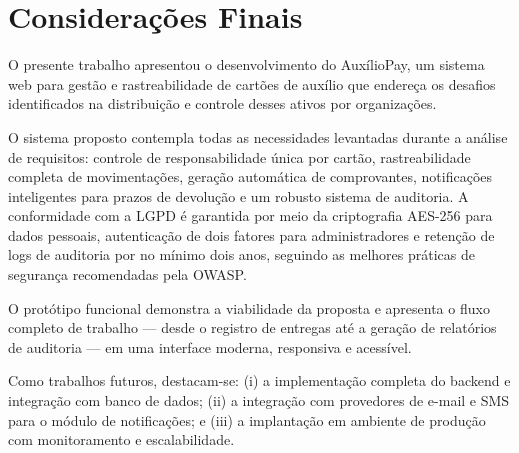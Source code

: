 \documentclass[
  article,
  a4paper,
  12pt,
  oneside,
  fleqn
]{abntex2}
\begin{document}
\section{Considerações Finais}

O presente trabalho apresentou o desenvolvimento do AuxílioPay, um sistema web para gestão e rastreabilidade de cartões de auxílio que endereça os desafios identificados na distribuição e controle desses ativos por organizações.

O sistema proposto contempla todas as necessidades levantadas durante a análise de requisitos: controle de responsabilidade única por cartão, rastreabilidade completa de movimentações, geração automática de comprovantes, notificações inteligentes para prazos de devolução e um robusto sistema de auditoria. A conformidade com a LGPD é garantida por meio da criptografia AES-256 para dados pessoais, autenticação de dois fatores para administradores e retenção de logs de auditoria por no mínimo dois anos, seguindo as melhores práticas de segurança recomendadas pela OWASP.

O protótipo funcional demonstra a viabilidade da proposta e apresenta o fluxo completo de trabalho --- desde o registro de entregas até a geração de relatórios de auditoria --- em uma interface moderna, responsiva e acessível.

Como trabalhos futuros, destacam-se: (i) a implementação completa do backend e integração com banco de dados; (ii) a integração com provedores de e-mail e SMS para o módulo de notificações; e (iii) a implantação em ambiente de produção com monitoramento e escalabilidade.
\end{document}
